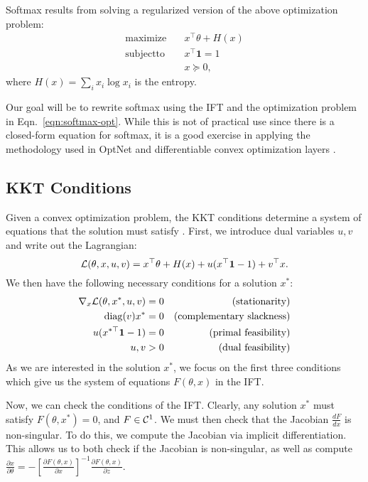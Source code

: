 \documentclass[11pt]{article}
\begin{document}
Softmax results from solving a regularized version of the above optimization problem:
\begin{equation}
\label{eqn:softmax-opt}
\begin{aligned}
\mathrm{maximize } \quad & x^\top\theta + H(x)\\
\mathrm{subject to } \quad & x^\top \mathbf{1} = 1\\
& x \succeq 0,
\end{aligned}
\end{equation}
where $H(x) = \sum_i x_i \log x_i$ is the entropy.

Our goal will be to rewrite softmax using the IFT and the optimization problem in
Eqn.~\ref{eqn:softmax-opt}.
While this is not of practical use since there is a closed-form equation
for softmax, it is a good exercise in applying the methodology
used in OptNet and differentiable convex optimization layers \citep{optnet,agrawal2019diffcvx}.

\subsection{KKT Conditions}
Given a convex optimization problem, the KKT conditions determine a system of equations
that the solution must satisfy \citep{kkt-thesis,kkt}.
First, we introduce dual variables $u,v$ and write out the Lagrangian:
$$\mathcal{L}(\theta, x, u, v) = x^\top\theta + H(x) + u(x^\top \mathbf{1} - 1) + v^\top x.$$
We then have the following necessary conditions for a solution $x^*$:
\begin{equation}
\begin{aligned}
\nabla_x \mathcal{L}(\theta, x^*,u,v) = 0 && \textrm{(stationarity)}\\
\mathrm{diag}(v)x^* = 0 && \textrm{(complementary slackness)}\\
u(x^{*\top} \mathbf{1} - 1) = 0 && \textrm{(primal feasibility)}\\
u,v > 0 && \textrm{(dual feasibility)}
\end{aligned}
\end{equation}
As we are interested in the solution $x^*$, we focus on the first three conditions
which give us the system of equations $F(\theta, x)$ in the IFT.

Now, we can check the conditions of the IFT.
Clearly, any solution $x^*$ must satisfy $F(\theta, x^*) = 0$,
and $F \in \mathcal{C}^1$.
We must then check that the Jacobian $\frac{dF}{dx}$ is non-singular.
To do this, we compute the Jacobian via implicit differentiation.
This allows us to both check if the Jacobian is non-singular,
as well as compute
$\frac{\partial x}{\partial \theta} = -[\frac{\partial F(\theta,x)}{\partial x}]^{-1}
    \frac{\partial F(\theta,x)}{\partial z}$.
\end{document}
